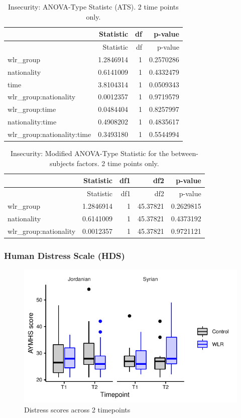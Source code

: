 \documentclass[]{article}
\begin{document}
\begin{longtable}[]{@{}lrrr@{}}
\caption{Insecurity: ANOVA-Type Statistc (ATS). 2 time points
only.}\tabularnewline
\toprule
& Statistic & df & p-value\tabularnewline
\midrule
\endfirsthead
\toprule
& Statistic & df & p-value\tabularnewline
\midrule
\endhead
wlr\_group & 1.2846914 & 1 & 0.2570286\tabularnewline
nationality & 0.6141009 & 1 & 0.4332479\tabularnewline
time & 3.8104314 & 1 & 0.0509343\tabularnewline
wlr\_group:nationality & 0.0012357 & 1 & 0.9719579\tabularnewline
wlr\_group:time & 0.0484404 & 1 & 0.8257997\tabularnewline
nationality:time & 0.4908202 & 1 & 0.4835617\tabularnewline
wlr\_group:nationality:time & 0.3493180 & 1 & 0.5544994\tabularnewline
\bottomrule
\end{longtable}

\begin{longtable}[]{@{}lrrrr@{}}
\caption{Insecurity: Modified ANOVA-Type Statistic for the
between-subjects factors. 2 time points only.}\tabularnewline
\toprule
& Statistic & df1 & df2 & p-value\tabularnewline
\midrule
\endfirsthead
\toprule
& Statistic & df1 & df2 & p-value\tabularnewline
\midrule
\endhead
wlr\_group & 1.2846914 & 1 & 45.37821 & 0.2629815\tabularnewline
nationality & 0.6141009 & 1 & 45.37821 & 0.4373192\tabularnewline
wlr\_group:nationality & 0.0012357 & 1 & 45.37821 &
0.9721121\tabularnewline
\bottomrule
\end{longtable}

\newpage

\hypertarget{human-distress-scale-hds-1}{%
\subsubsection{Human Distress Scale
(HDS)}\label{human-distress-scale-hds-1}}

\begin{figure}[H]

{\centering \includegraphics{WLR-analyses-report_files/figure-latex/unnamed-chunk-37-1} 

}

\caption{Distress scores across 2 timepoints}\label{fig:unnamed-chunk-37}
\end{figure}
\end{document}
